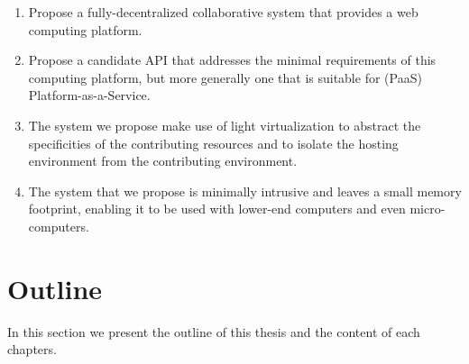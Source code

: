 \documentclass[12pt, titlepage]{uo_temp}
\begin{document}
     \begin{enumerate}[label={\bf Contribution \arabic*},
                       wide=\parindent,
                       leftmargin=\parindent,
                       rightmargin=\parindent]
     \item Propose a fully-decentralized collaborative system that provides a web
       computing platform.
     \item Propose a candidate API that addresses the minimal requirements of this
       computing platform, but more generally one that is suitable for (PaaS)
       Platform-as-a-Service.
     \item The system we propose make use of light virtualization to abstract the
       specificities of the contributing resources and to isolate the hosting environment
       from the contributing environment.
     \item The system that we propose is minimally intrusive and leaves a small memory
       footprint, enabling it to be used with lower-end computers and even
       micro-computers.
     \end{enumerate}

     \section{Outline}

     In this section we present the outline of this thesis and the content of each
     chapters.
\end{document}
